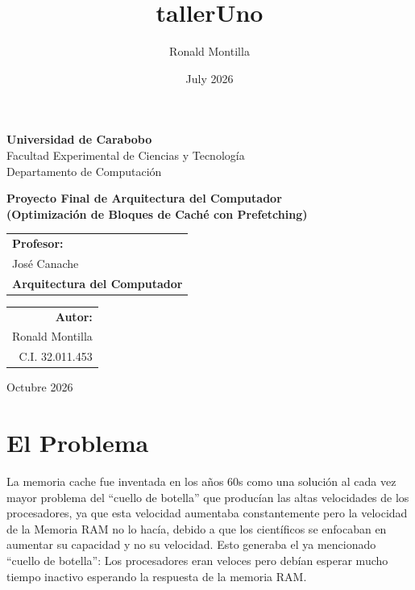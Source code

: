 \documentclass[12pt, a4paper]{article}
\title{tallerUno}
\author{Ronald Montilla}
\date{July 2026}
\begin{document}
\begin{titlepage}
    \centering %

    {\bfseries\LARGE Universidad de Carabobo} \\[0.4cm]
    {\LARGE Facultad Experimental de Ciencias y Tecnología} \\[0.2cm]
    {\LARGE Departamento de Computación} \\[1.5cm]
    

    
    \vfill

    {\bfseries\Huge Proyecto Final de Arquitectura del Computador} \\[0.5cm]
    {\bfseries (Optimización de Bloques de Caché con Prefetching)}
    
    \vfill
    
    \vfill
    \begin{tabular}[t]{l}
        \large\textbf{Profesor:} \\
        \large José Canache \\
        \large\textbf{Arquitectura del Computador}
    \end{tabular}
    \hfill
    \begin{tabular}[t]{r}
        \large\textbf{Autor:} \\
        \large Ronald Montilla \\
        \large C.I. 32.011.453
    \end{tabular}

    {Octubre 2026}
    
\end{titlepage}
\newpage 
\tableofcontents
\newpage
\section{El Problema}
La memoria cache fue inventada en los años 60s como una solución al cada vez mayor problema del ``cuello de botella'' que producían las altas velocidades de los procesadores, ya que esta velocidad aumentaba constantemente pero la velocidad de la Memoria RAM no lo hacía, debido a que los científicos se enfocaban en aumentar su capacidad y no su velocidad. Esto generaba el ya mencionado ``cuello de botella'': Los procesadores eran veloces pero debían esperar mucho tiempo inactivo esperando la respuesta de la memoria RAM.
\end{document}
